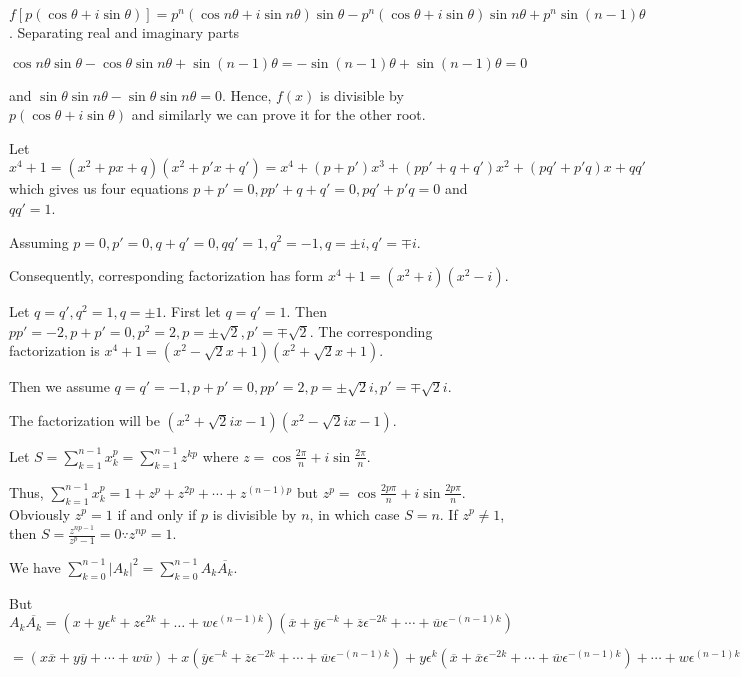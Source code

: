   $f[p(\cos\theta + i\sin\theta)] = p^n(\cos n\theta + i\sin n\theta)\sin\theta - p^n(\cos\theta + i\sin
  \theta)\sin n\theta + p^n\sin(n - 1)\theta$. Separating real and imaginary parts

  $\cos n\theta\sin\theta - \cos\theta\sin n\theta + \sin(n - 1)\theta = -\sin(n - 1)\theta + \sin(n -
  1)\theta = 0$

  and $\sin\theta\sin n\theta - \sin\theta\sin n\theta = 0$. Hence, $f(x)$ is divisible by $p(\cos\theta +
  i\sin\theta)$ and similarly we can prove it for the other root.
\item Let $x^4 + 1 = (x^2 + px + q)(x^2 + p'x + q') = x^4 + (p + p')x^3 + (pp' + q + q')x^2 + (pq' + p'q)x +
  qq'$ which gives us four equations $p + p' = 0, pp' + q + q' = 0, pq' + p'q = 0$ and $qq' = 1$.

  Assuming $p = 0, p' = 0, q + q' = 0, qq' = 1, q^2 = -1, q = \pm i, q' = \mp i$.

  Consequently, corresponding factorization has form $x^4 + 1 = (x^2 + i)(x^2 - i)$.

  Let $q = q', q^2 = 1, q = \pm 1$. First let $q = q' = 1$. Then $pp' = -2, p + p' = 0, p^2 = 2, p =
  \pm\sqrt{2}, p' = \mp\sqrt{2}$. The corresponding factorization is $x^4 + 1 = (x^2 - \sqrt{2}x + 1)(x^2 +
  \sqrt{2}x + 1)$.

  Then we assume $q = q' = -1, p + p' = 0, pp' = 2, p = \pm \sqrt{2}i, p' = \mp\sqrt{2}i$.

  The factorization will be $(x^2 + \sqrt{2}ix - 1)(x^2 - \sqrt{2}ix - 1)$.
\item Let $S = \displaystyle\sum_{k = 1}^{n - 1}x_k^p = \sum_{k = 1}^{n - 1}z^{kp}$ where $z =
  \cos\frac{2\pi}{n} + i\sin\frac{2\pi}{n}$.

  Thus, $\displaystyle\sum_{k = 1}^{n - 1}x_k^p = 1 + z^p + z^{2p} + \cdots + z^{(n - 1)p}$ but $z^p =
  \cos\frac{2p\pi}{n} + i\sin\frac{2p\pi}{n}$. Obviously $z^p = 1$ if and only if $p$ is divisible by $n$,
  in which case $S = n$. If $z^p\neq 1$, then $S = \frac{z^{np - 1}}{z^p - 1} = 0\because z^{np} = 1$.
\item We have $\displaystyle\sum_{k=0}^{n - 1}|A_k|^2 = \sum_{k=0}^{n - 1}A_k\overline{A_k}$.

  But $A_k\overline{A_k} = (x + y\epsilon^k + z\epsilon^{2k} + \ldots + w\epsilon^{(n - 1)k})(\overline{x} +
  \overline{y}\epsilon^{-k} + \overline{z}\epsilon^{-2k} + \cdots + \overline{w}\epsilon^{-(n - 1)k})$

  $= (x\overline{x} + y\overline{y} + \cdots + w\overline{w})+ x(\overline{y}\epsilon^{-k} +
  \overline{z}\epsilon^{-2k} + \cdots + \overline{w}\epsilon^{-(n - 1)k}) + y\epsilon^k(\overline{x} +
  \overline{x}\epsilon^{-2k} + \cdots + \overline{w}\epsilon^{-(n - 1)k}) + \cdots + w\epsilon^{(n -
    1)k}(\overline{x} + \overline{y}\epsilon^{-k} + \cdots + \overline{u}\epsilon^{-(n - 2)k})$

